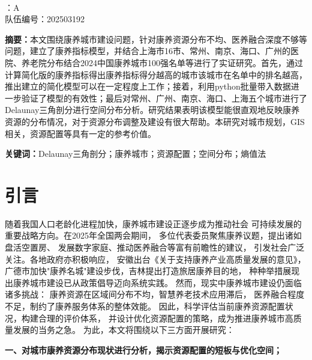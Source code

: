 \documentclass[12pt,a4paper]{article}
\begin{document}
\thispagestyle{empty}
\begin{center}
     \\
    \vspace{1em}
    ：A \\
    \quad 队伍编号：202503192 \\
\end{center}

\vspace{2em}

\noindent\textbf{摘要：}本文围绕康养城市建设问题，针对康养资源分布不均、医养融合深度不够等问题，建立了康养指标模型，并结合上海市16市、常州、南京、海口、广州的医院、养老院分布结合2024中国康养城市100强名单等进行了实证研究。首先，通过计算简化版的康养指标得出康养指标得分越高的城市该城市在名单中的排名越高，推出建立的简化模型可以在一定程度上工作；接着，利用python批量带入数据进一步验证了模型的有效性；最后对常州、广州、南京、海口、上海五个城市进行了Delaunay三角剖分进行空间分布分析。研究结果表明该模型能很直观地反映康养资源的分布情况，对于资源分布调整及建设有很大帮助。本研究对城市规划，GIS相关，资源配置等具有一定的参考价值。

\vspace{1em}

\noindent\textbf{关键词：}Delaunay三角剖分；康养城市；资源配置；空间分布；熵值法

\newpage

\setcounter{page}{1}
\twocolumn[]

\section{引言}

随着我国人口老龄化进程加快，康养城市建设正逐步成为推动社会
可持续发展的重要战略方向。在2025年全国两会期间，
多位代表委员聚焦康养议题，提出诸如盘活空置房、
发展数字家庭、推动医养融合等富有前瞻性的建议，
引发社会广泛关注。各地政府亦积极响应，
安徽出台《关于支持康养产业高质量发展的意见》\cite{01}，
广德市加快"康养名城"建设步伐，吉林提出打造旅居康养目的地，
种种举措展现出康养城市建设已从政策倡导迈向系统实践。
然而，现实中康养城市建设仍面临诸多挑战：
康养资源在区域间分布不均，智慧养老技术应用滞后，
医养融合程度不足，制约了康养服务体系的整体效能。
因此，科学评估当前康养资源配置状况，构建合理的评价体系，
并设计优化资源配置的策略，成为推进康养城市高质量发展的当务之急。
为此，本文将围绕以下三方面开展研究：

\textbf{一、对城市康养资源分布现状进行分析，揭示资源配置的短板与优化空间；}
\end{document}
